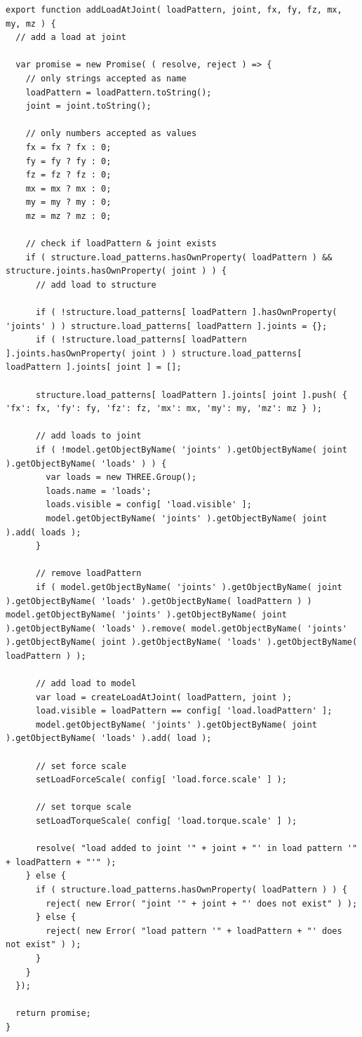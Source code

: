 \begin{lstlisting}[language={},caption=Función \texttt{addLoadAtJoint()} implementada en el archivo \texttt{FEM.js}.,label=alg:FEM.js-addLoadAtJoint, frame=single]
export function addLoadAtJoint( loadPattern, joint, fx, fy, fz, mx, my, mz ) {
  // add a load at joint

  var promise = new Promise( ( resolve, reject ) => {
    // only strings accepted as name
    loadPattern = loadPattern.toString();
    joint = joint.toString();

    // only numbers accepted as values
    fx = fx ? fx : 0;
    fy = fy ? fy : 0;
    fz = fz ? fz : 0;
    mx = mx ? mx : 0;
    my = my ? my : 0;
    mz = mz ? mz : 0;

    // check if loadPattern & joint exists
    if ( structure.load_patterns.hasOwnProperty( loadPattern ) && structure.joints.hasOwnProperty( joint ) ) {
      // add load to structure

      if ( !structure.load_patterns[ loadPattern ].hasOwnProperty( 'joints' ) ) structure.load_patterns[ loadPattern ].joints = {};
      if ( !structure.load_patterns[ loadPattern ].joints.hasOwnProperty( joint ) ) structure.load_patterns[ loadPattern ].joints[ joint ] = [];

      structure.load_patterns[ loadPattern ].joints[ joint ].push( { 'fx': fx, 'fy': fy, 'fz': fz, 'mx': mx, 'my': my, 'mz': mz } );

      // add loads to joint
      if ( !model.getObjectByName( 'joints' ).getObjectByName( joint ).getObjectByName( 'loads' ) ) {
        var loads = new THREE.Group();
        loads.name = 'loads';
        loads.visible = config[ 'load.visible' ];
        model.getObjectByName( 'joints' ).getObjectByName( joint ).add( loads );
      }

      // remove loadPattern
      if ( model.getObjectByName( 'joints' ).getObjectByName( joint ).getObjectByName( 'loads' ).getObjectByName( loadPattern ) ) model.getObjectByName( 'joints' ).getObjectByName( joint ).getObjectByName( 'loads' ).remove( model.getObjectByName( 'joints' ).getObjectByName( joint ).getObjectByName( 'loads' ).getObjectByName( loadPattern ) );

      // add load to model
      var load = createLoadAtJoint( loadPattern, joint );
      load.visible = loadPattern == config[ 'load.loadPattern' ];
      model.getObjectByName( 'joints' ).getObjectByName( joint ).getObjectByName( 'loads' ).add( load );

      // set force scale
      setLoadForceScale( config[ 'load.force.scale' ] );

      // set torque scale
      setLoadTorqueScale( config[ 'load.torque.scale' ] );

      resolve( "load added to joint '" + joint + "' in load pattern '" + loadPattern + "'" );
    } else {
      if ( structure.load_patterns.hasOwnProperty( loadPattern ) ) {
        reject( new Error( "joint '" + joint + "' does not exist" ) );
      } else {
        reject( new Error( "load pattern '" + loadPattern + "' does not exist" ) );
      }
    }
  });

  return promise;
}
\end{lstlisting}
\bigskip

